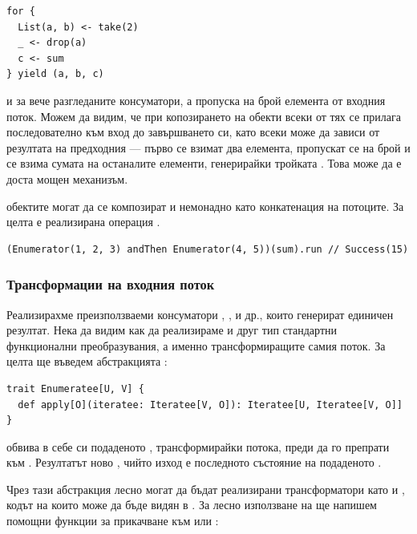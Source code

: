 \begin{lstlisting}
for {
  List(a, b) <- take(2)
  _ <- drop(a)
  c <- sum
} yield (a, b, c)
\end{lstlisting}

 и  за вече разгледаните  консуматори, а  пропуска  на брой елемента от входния поток. Можем да видим, че при копозирането на  обекти всеки от тях се прилага последователно към вход до завършването си, като всеки може да зависи от резултата на предходния — първо се взимат два елемента, пропускат се  на брой и се взима сумата на останалите елементи, генерирайки тройката . Това може да е доста мощен механизъм.

 обектите могат да се композират и немонадно като конкатенация на потоците. За целта е реализирана операция .

\begin{lstlisting}
(Enumerator(1, 2, 3) andThen Enumerator(4, 5))(sum).run // Success(15)
\end{lstlisting}

\subsubsection{Трансформации на входния поток}

Реализирахме преизползваеми консуматори , ,  и др., които генерират единичен резултат. Нека да видим как да реализираме и друг тип стандартни функционални преобразувания, а именно трансформиращите самия поток. За целта ще въведем абстракцията :

\begin{lstlisting}
trait Enumeratee[U, V] {
  def apply[O](iteratee: Iteratee[V, O]): Iteratee[U, Iteratee[V, O]]
}
\end{lstlisting}

 обвива в себе си подаденото , трансформирайки потока, преди да го препрати към . Резултатът ново , чийто изход е последното състояние на подаденото .

Чрез тази абстракция лесно могат да бъдат реализирани трансформатори като  и , кодът на които може да бъде видян в . За лесно използване на  ще напишем помощни функции за прикачване към  или :

